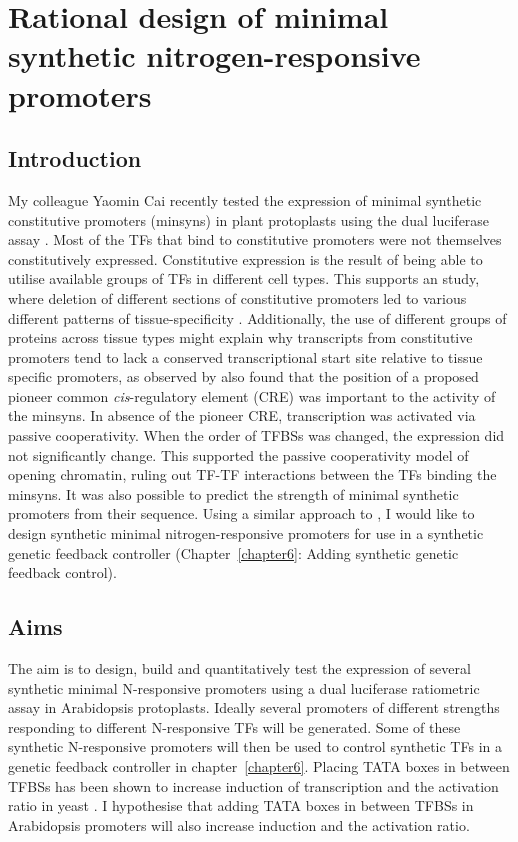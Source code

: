 \documentclass[../main.tex]{subfiles}
\begin{document}
\chapter{Rational design of minimal synthetic nitrogen-responsive promoters}\label{chapter5}
\section{Introduction}\label{chapter5:introduction}
My colleague Yaomin Cai recently tested the expression of minimal synthetic constitutive promoters (minsyns) in plant protoplasts using the dual luciferase assay \autocite{caiRationalDesignMinimal2020}.
Most of the TFs that bind to constitutive promoters were not themselves constitutively expressed.
Constitutive expression is the result of being able to utilise available groups of TFs in different cell types.
This supports an study, where deletion of different sections of constitutive promoters led to various different patterns of tissue-specificity \autocite{benfeyTissuespecificExpressionCaMV1990}.
Additionally, the use of different groups of proteins across tissue types might explain why transcripts from constitutive promoters tend to lack a conserved transcriptional start site relative to tissue specific promoters, as observed by %
\textcite*{caiRationalDesignMinimal2020} also found that the position of a proposed pioneer common \textit{cis}\hyp{}regulatory element (CRE) was important to the activity of the minsyns.
In absence of the pioneer CRE, transcription was activated via passive cooperativity.
When the order of TFBSs was changed, the expression did not significantly change.
This supported the passive cooperativity model of opening chromatin, ruling out TF-TF interactions between the TFs binding the minsyns.
It was also possible to predict the strength of minimal synthetic promoters from their sequence.
Using a similar approach to \textcite*{caiRationalDesignMinimal2020}, I would like to design synthetic minimal nitrogen-responsive promoters for use in a synthetic genetic feedback controller (Chapter~\ref{chapter6}: Adding synthetic genetic feedback control).
\section{Aims}\label{chapter5:aims}
The aim is to design, build and quantitatively test the expression of several synthetic minimal N\hyp{}responsive promoters using a dual luciferase ratiometric assay in Arabidopsis protoplasts.
Ideally several promoters of different strengths responding to different N\hyp{}responsive TFs will be generated.
Some of these synthetic N\hyp{}responsive promoters will then be used to control synthetic TFs in a genetic feedback controller in chapter~\ref{chapter6}.
Placing TATA boxes in between TFBSs has been shown to increase induction of transcription and the activation ratio in yeast \autocite{kotopkaModeldrivenGenerationArtificial2020}.
I hypothesise that adding TATA boxes in between TFBSs in Arabidopsis promoters will also increase induction and the activation ratio.
\end{document}
